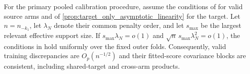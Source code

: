 \documentclass[12pt]{article}
\begin{document}
\begin{proposition}\label{prop:training_moment_verification}
For the primary pooled calibration procedure, assume the conditions of  for valid source arms and of \cref{prop:target_only_asymptotic_linearity} for the target. Let $n=n_{-k_1}$, let $\lambda_N$ denote their common penalty order, and let $s_{\max}$ be the largest relevant effective support size. If $s_{\max}\lambda_N=o(1)$ and $\sqrt n\,s_{\max}\lambda_N^2=o(1)$, the conditions in  hold uniformly over the fixed outer folds. Consequently, valid training discrepancies are $O_p(n^{-1/2})$ and their fitted-score covariance blocks are consistent, including shared-target and cross-arm products.
\end{proposition}
\end{document}
